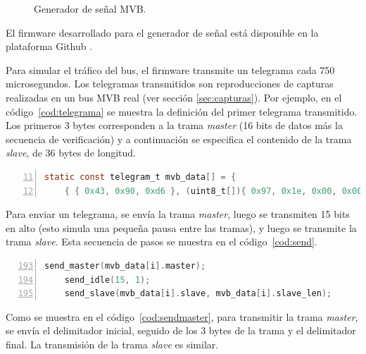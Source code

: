 \begin{figure}[htbp]
	\centering
    {
        \fontsize{8pt}{8pt}\selectfont
        
    }
	\caption{Generador de señal MVB.}
    \label{fig:generador}
\end{figure}

El firmware desarrollado para el generador de señal está disponible en la plataforma Github \cite{mvbgen}.

Para simular el tráfico del bus, el firmware transmite un telegrama cada 750 microsegundos.
Los telegramas transmitidos son reproducciones de capturas realizadas en un bus MVB real (ver sección \ref{sec:capturas}). Por ejemplo, en el código~\ref{cod:telegrama} se muestra la definición del primer telegrama transmitido.
Los primeros 3 bytes corresponden a la trama \textit{master} (16 bits de datos más la secuencia de verificación) y a continuación se especifica el contenido de la trama \textit{slave}, de 36 bytes de longitud.

\begin{lstlisting}[label=cod:telegrama,caption=Definición de un telegrama a transmitir (\texttt{gen.c}).,float=htbp,numberstyle=\footnotesize\ttfamily,language=C,breaklines=true,numbers=left,firstnumber=11,xleftmargin=1cm]
static const telegram_t mvb_data[] = {
    { { 0x43, 0x90, 0xd6 }, (uint8_t[]){ 0x97, 0x1e, 0x00, 0x00, 0x00, 0x82, 0x14, 0x06, 0xdf, 0x1e, 0x0b, 0x31, 0x0f, 0x00, 0x17, 0x05, 0x8c, 0xf8, 0x00, 0x00, 0x00, 0x00, 0x00, 0x00, 0x03, 0x4d, 0xc9, 0x11, 0x94, 0x11, 0xa8, 0x11, 0xa8, 0x04, 0x05, 0x88 }, 36 },
\end{lstlisting}

Para enviar un telegrama, se envía la trama \textit{master}, luego se transmiten 15 bits en alto (esto simula una pequeña pausa entre las tramas), y luego se transmite la trama \textit{slave}. Esta secuencia de pasos se muestra en el código~\ref{cod:send}.

\begin{lstlisting}[label=cod:send,caption=Secuencia de pasos para transmitir un telegrama (\texttt{gen.c}).,float=htbp,numberstyle=\footnotesize\ttfamily,language=C,breaklines=true,numbers=left,firstnumber=193,xleftmargin=1cm]
    send_master(mvb_data[i].master);
    send_idle(15, 1);
    send_slave(mvb_data[i].slave, mvb_data[i].slave_len);
\end{lstlisting}

Como se muestra en el código~\ref{cod:sendmaster}, para transmitir la trama \textit{master}, se envía el delimitador inicial, seguido de los 3 bytes de la trama y el delimitador final. La transmisión de la trama \textit{slave} es similar.

